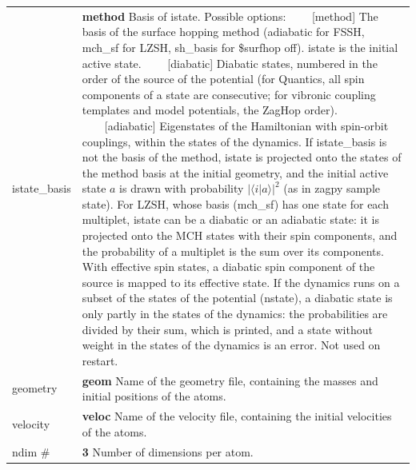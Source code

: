 \documentclass{report}
\newcommand{\tabitem}{~~\llap{--}~~}
\begin{document}
\begin{tabularx}{\textwidth}{ m{2.5cm} X }
istate\_basis	&
    \textbf{method} \newline
    Basis of istate. Possible options: \newline
	\tabitem [method] The basis of the surface hopping method (adiabatic for FSSH, mch\_sf for LZSH, sh\_basis for \$surfhop off). istate is the initial active state. \newline
	\tabitem [diabatic] Diabatic states, numbered in the order of the source of the potential (for Quantics, all spin components of a state are consecutive; for vibronic coupling templates and model potentials, the ZagHop order). \newline
	\tabitem [adiabatic] Eigenstates of the Hamiltonian with spin-orbit couplings, within the states of the dynamics. \newline
	If istate\_basis is not the basis of the method, istate is projected onto the states of the method basis at the initial geometry, and the initial active state $a$ is drawn with probability $|\langle i | a \rangle|^2$ (as in zagpy sample state). For LZSH, whose basis (mch\_sf) has one state for each multiplet, istate can be a diabatic or an adiabatic state: it is projected onto the MCH states with their spin components, and the probability of a multiplet is the sum over its components. With effective spin states, a diabatic spin component of the source is mapped to its effective state. If the dynamics runs on a subset of the states of the potential (nstate), a diabatic state is only partly in the states of the dynamics: the probabilities are divided by their sum, which is printed, and a state without weight in the states of the dynamics is an error. Not used on restart.  \\

geometry 		&
    \textbf{geom} \newline
    Name of the geometry file, containing the masses and initial positions of the atoms.  \\

velocity		&
    \textbf{veloc} \newline
    Name of the velocity file, containing the initial velocities of the atoms.  \\

ndim \#		&
    \textbf{3} \newline
    Number of dimensions per atom.  \\


\end{tabularx}
\end{document}

